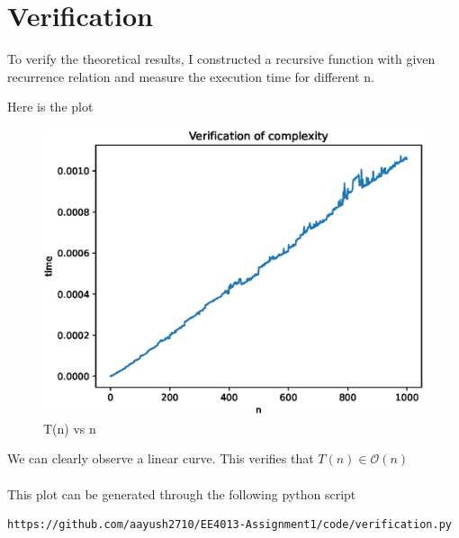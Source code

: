 \documentclass[journal,12pt,twocolumn]{IEEEtran}
\begin{document}
\section{Verification}
To verify the theoretical results, I constructed a recursive function with given recurrence relation and measure the execution time for different n.

Here is the plot
\begin{figure}[!h]
    \centering
    \includegraphics[scale=0.6]{figs/plot.eps}
    \caption{T(n) vs n}
    \label{fig:verification}
\end{figure}

We can clearly observe a linear curve. This verifies that 
$T(n) \in \mathcal{O}(n)$
\\
\\
This plot can be generated through the following python script
\begin{lstlisting}
https://github.com/aayush2710/EE4013-Assignment1/code/verification.py
\end{lstlisting}
\end{document}
